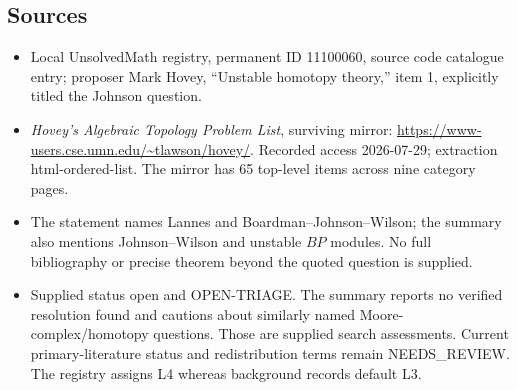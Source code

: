 \documentclass[11pt]{article}
\begin{document}
\subsection{Sources}
\begin{itemize}
\item Local UnsolvedMath registry, permanent ID 11100060, source code catalogue entry; proposer Mark Hovey, ``Unstable homotopy theory,'' item 1, explicitly titled the Johnson question.
\item \emph{Hovey's Algebraic Topology Problem List}, surviving mirror: \url{https://www-users.cse.umn.edu/~tlawson/hovey/}. Recorded access 2026-07-29; extraction html-ordered-list. The mirror has 65 top-level items across nine category pages.
\item The statement names Lannes and Boardman--Johnson--Wilson; the summary also mentions Johnson--Wilson and unstable \(BP\) modules. No full bibliography or precise theorem beyond the quoted question is supplied.
\item Supplied status open and OPEN-TRIAGE. The summary reports no verified resolution found and cautions about similarly named Moore-complex/homotopy questions. Those are supplied search assessments. Current primary-literature status and redistribution terms remain NEEDS\_REVIEW. The registry assigns L4 whereas background records default L3.
\end{itemize}
\end{document}
